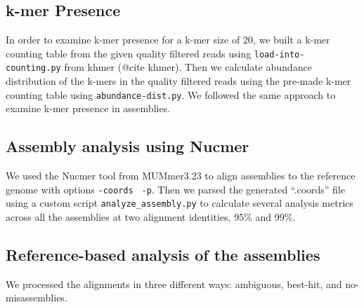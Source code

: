 \documentclass[10pt,a4paper,twocolumn]{article}
\begin{document}

\subsection*{k-mer Presence}
In order to examine k-mer presence for a k-mer size of 20, we built a
k-mer counting table from the given quality filtered reads using
{\tt{load-into-counting.py}} from khmer (@cite khmer). Then we
calculate abundance distribution of the k-mers in the quality filtered
reads using the pre-made k-mer counting table using
{\tt{abundance-dist.py}}. We followed the same approach to examine
k-mer presence in assemblies.

\subsection*{Assembly analysis using Nucmer}

We used the Nucmer tool from MUMmer3.23 \cite{mummer3.0} to align
assemblies to the reference genome with options {\tt \--coords} {\tt
  -p}. Then we parsed the generated ``.coords'' file using a custom
script {\tt{analyze\_assembly.py}} to calculate several analysis
metrics across all the assemblies at two alignment identities, 95\% and 99\%.

\subsection*{Reference-based analysis of the assemblies}
We processed the alignments in three different ways: ambiguous,
best-hit, and no-misassemblies.



\end{document}
